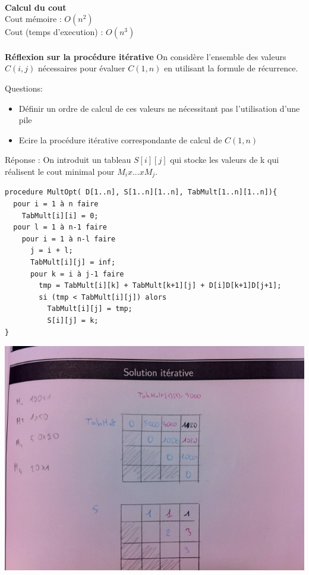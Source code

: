 \paragraph{}
\textbf{Calcul du cout}\\
Cout mémoire : $O(n^2)$\\
Cout (temps d'execution) : $O(n^3)$

\paragraph{}
\textbf{Réflexion sur la procédure itérative}
On considère l'ensemble des valeurs $C(i,j)$ nécessaires pour évaluer $C(1,n)$ en utilisant
la formule de récurrence.

Questions:
\begin{itemize}
 \item Définir un ordre de calcul de ces valeurs ne nécessitant pas l'utilisation d'une pile
 \item Ecire la procédure itérative correspondante de calcul de $C(1,n)$
\end{itemize}

Réponse : On introduit un tableau $S[i][j]$ qui stocke les valeurs de k 
qui réalisent le cout minimal pour $M_i x ... x M_j$.

\begin{verbatim}
procedure MultOpt( D[1..n], S[1..n][1..n], TabMult[1..n][1..n]){
  pour i = 1 à n faire
    TabMult[i][i] = 0;
  pour l = 1 à n-1 faire
    pour i = 1 à n-l faire
      j = i + l;
      TabMult[i][j] = inf;
      pour k = i à j-1 faire
        tmp = TabMult[i][k] + TabMult[k+1][j] + D[i]D[k+1]D[j+1];
        si (tmp < TabMult[i][j]) alors
          TabMult[i][j] = tmp;
          S[i][j] = k;
}
\end{verbatim}

\includegraphics[width=15cm]{matmult}

